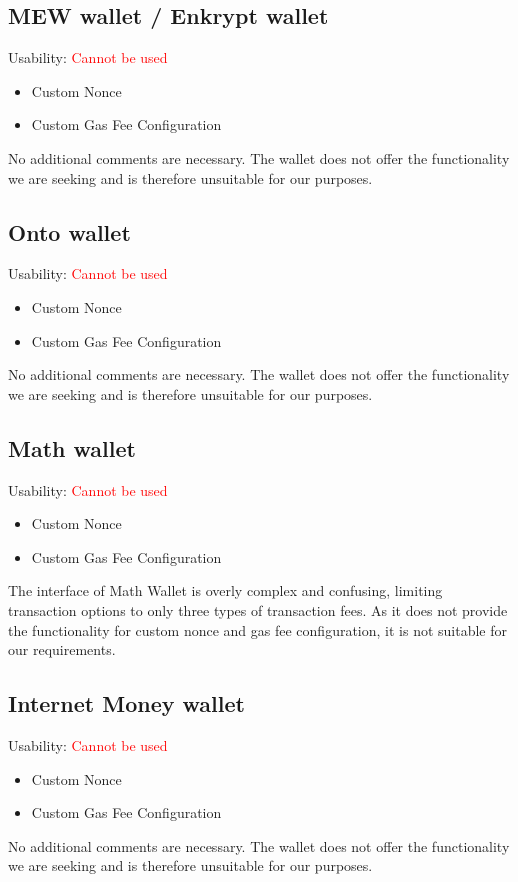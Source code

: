 \documentclass[fleqn,10pt]{olplainarticle}
\newcommand{\cmark}{\ding{51}}%
\newcommand{\xmark}{\ding{55}}%
\begin{document}
\subsection{MEW wallet / Enkrypt wallet }
Usability: \textcolor{red}{Cannot be used}
\begin{itemize}[noitemsep, nolistsep]
	\item [\textcolor{red}{\xmark}] Custom Nonce
	\item [\textcolor{red}{\xmark}] Custom Gas Fee Configuration
\end{itemize}
No additional comments are necessary. The wallet does not offer the functionality we are seeking and is therefore unsuitable for our purposes.

\subsection{Onto wallet}
Usability: \textcolor{red}{Cannot be used}
\begin{itemize}[noitemsep, nolistsep]
	\item [\textcolor{red}{\xmark}] Custom Nonce
	\item [\textcolor{red}{\xmark}] Custom Gas Fee Configuration
\end{itemize}
No additional comments are necessary. The wallet does not offer the functionality we are seeking and is therefore unsuitable for our purposes.

\subsection{Math wallet}
Usability: \textcolor{red}{Cannot be used}
\begin{itemize}[noitemsep, nolistsep]
	\item [\textcolor{red}{\xmark}] Custom Nonce
	\item [\textcolor{red}{\xmark}] Custom Gas Fee Configuration
\end{itemize}
The interface of Math Wallet is overly complex and confusing, limiting transaction options to only three types of transaction fees. As it does not provide the functionality for custom nonce and gas fee configuration, it is not suitable for our requirements.

\subsection{Internet Money wallet}
Usability: \textcolor{red}{Cannot be used}
\begin{itemize}[noitemsep, nolistsep]
	\item [\textcolor{red}{\xmark}] Custom Nonce
	\item [\textcolor{green}{\cmark}] Custom Gas Fee Configuration
\end{itemize}
No additional comments are necessary. The wallet does not offer the functionality we are seeking and is therefore unsuitable for our purposes.
\end{document}
